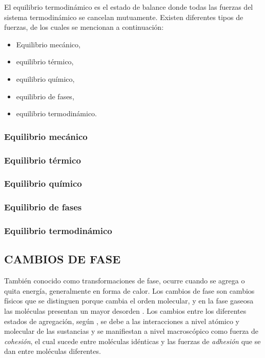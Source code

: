 El equilibrio termodinámico es el estado de balance donde todas las fuerzas del sistema termodinámico se cancelan mutuamente. \newline
Existen diferentes tipos de fuerzas, de los cuales se mencionan a continuación:
\begin{itemize}
  \item Equilibrio mecánico,
  \item equilibrio térmico,
  \item equilibrio químico,
  \item equilibrio de fases,
  \item equilibrio termodinámico.
\end{itemize}

\subsubsection*{Equilibrio mecánico}
\subsubsection*{Equilibrio térmico}
\subsubsection*{Equilibrio químico}
\subsubsection*{Equilibrio de fases}
\subsubsection*{Equilibrio termodinámico}



\subsection{CAMBIOS DE FASE}
    También conocido como transformaciones de fase, ocurre cuando se agrega o quita energía, generalmente en forma de calor. Los cambios de fase son cambios físicos que se distinguen porque  cambia el orden molecular, y en la fase gaseosa las moléculas presentan un mayor desorden \parencite[p. 489]{ChangQmc2010}. Los cambios entre los diferentes estados de agregación, según \parencite{ReyesChumacero2012}, se debe a las interacciones a nivel atómico y molecular de las sustancias y se manifiestan a nivel macroscópico como fuerza de {\it cohesión}, el cual sucede entre moléculas idénticas y las fuerzas de {\it adhesión} que se dan entre moléculas diferentes.


